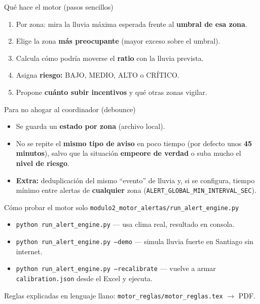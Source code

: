 \documentclass[aspectratio=169,spanish]{beamer}
\begin{document}
\begin{frame}{Qué hace el motor (pasos sencillos)}
  \small
  \begin{enumerate}
    \item Por zona: mira la lluvia máxima esperada frente al \textbf{umbral de esa zona}.
    \item Elige la zona \textbf{más preocupante} (mayor exceso sobre el umbral).
    \item Calcula cómo podría moverse el \textbf{ratio} con la lluvia prevista.
    \item Asigna \textbf{riesgo:} BAJO, MEDIO, ALTO o CRÍTICO.
    \item Propone \textbf{cuánto subir incentivos} y qué otras zonas vigilar.
  \end{enumerate}
\end{frame}

\begin{frame}{Para no ahogar al coordinador (debounce)}
  \begin{itemize}
    \item Se guarda un \textbf{estado por zona} (archivo local).
    \item No se repite el \textbf{mismo tipo de aviso} en poco tiempo (por defecto unos \textbf{45 minutos}), salvo que la situación \textbf{empeore de verdad} o suba mucho el \textbf{nivel de riesgo}.
    \item \textbf{Extra:} deduplicación del mismo ``evento'' de lluvia y, si se configura, tiempo mínimo entre alertas de \textbf{cualquier} zona (\texttt{ALERT\_GLOBAL\_MIN\_INTERVAL\_SEC}).
  \end{itemize}
\end{frame}

\begin{frame}{Cómo probar el motor solo}
  \texttt{modulo2\_motor\_alertas/run\_alert\_engine.py}
  \vspace{0.5em}
  \begin{itemize}
    \item \texttt{python run\_alert\_engine.py} — usa clima real, resultado en consola.
    \item \texttt{python run\_alert\_engine.py --demo} — simula lluvia fuerte en Santiago sin internet.
    \item \texttt{python run\_alert\_engine.py --recalibrate} — vuelve a armar \texttt{calibration.json} desde el Excel y ejecuta.
  \end{itemize}
  \vspace{0.3em}
  \small Reglas explicadas en lenguaje llano: \texttt{motor\_reglas/motor\_reglas.tex} $\rightarrow$ PDF.
\end{frame}
\end{document}
